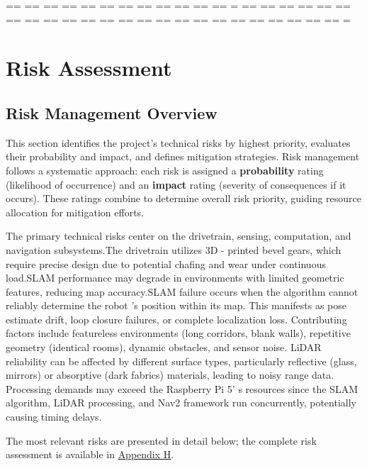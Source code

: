     == == == == == == == == == == == ==
    = %
      == == == == == == == == == == == == == == == == == == == == == == == ==
    =

\section {
  Risk Assessment
}
\label {
sec:
  risks
}

\subsection{Risk Management Overview}

This section identifies the project's technical risks by highest priority, evaluates their probability and impact, and defines mitigation strategies. Risk management follows a systematic approach: each risk is assigned a \textbf{probability} rating (likelihood of occurrence) and an \textbf{impact} rating (severity of consequences if it occurs). These ratings combine to determine overall risk priority, guiding resource allocation for mitigation efforts.

    The primary technical risks center on the drivetrain,
    sensing, computation,
    and navigation subsystems.The drivetrain utilizes 3D - printed bevel gears,
    which require precise design due to potential chafing and wear under
        continuous load.SLAM performance may degrade in environments with
            limited geometric features,
    reducing map accuracy.SLAM failure occurs when the algorithm cannot reliably
        determine the
            robot 's position within its map. This manifests as pose estimate drift, loop closure failures, or complete localization loss. Contributing factors include featureless environments (long corridors, blank walls), repetitive geometry (identical rooms), dynamic obstacles, and sensor noise. LiDAR reliability can be affected by different surface types, particularly reflective (glass, mirrors) or absorptive (dark fabrics) materials, leading to noisy range data. Processing demands may exceed the Raspberry Pi 5' s
                resources since the SLAM algorithm,
    LiDAR processing, and Nav2 framework run concurrently,
    potentially causing timing delays.

    The most relevant risks are presented in detail below;
the complete risk assessment is available in \hyperref [app:risks]{Appendix H}.


